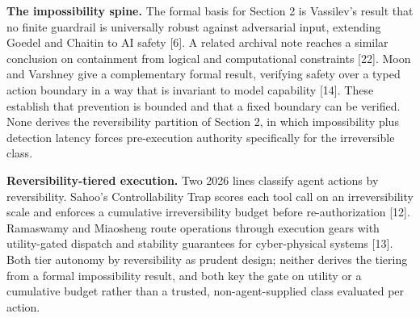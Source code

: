 \documentclass[
  11pt,
]{article}
\begin{document}
\textbf{The impossibility spine.} The formal basis for Section 2 is
Vassilev's result that no finite guardrail is universally robust against
adversarial input, extending Goedel and Chaitin to AI safety {[}6{]}. A
related archival note reaches a similar conclusion on containment from
logical and computational constraints {[}22{]}. Moon and Varshney give a
complementary formal result, verifying safety over a typed action
boundary in a way that is invariant to model capability {[}14{]}. These
establish that prevention is bounded and that a fixed boundary can be
verified. None derives the reversibility partition of Section 2, in
which impossibility plus detection latency forces pre-execution
authority specifically for the irreversible class.

\textbf{Reversibility-tiered execution.} Two 2026 lines classify agent
actions by reversibility. Sahoo's Controllability Trap scores each tool
call on an irreversibility scale and enforces a cumulative
irreversibility budget before re-authorization {[}12{]}. Ramaswamy and
Miaosheng route operations through execution gears with utility-gated
dispatch and stability guarantees for cyber-physical systems {[}13{]}.
Both tier autonomy by reversibility as prudent design; neither derives
the tiering from a formal impossibility result, and both key the gate on
utility or a cumulative budget rather than a trusted, non-agent-supplied
class evaluated per action.
\end{document}
